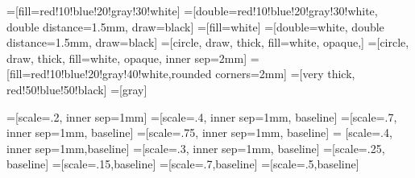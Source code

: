 =[fill=red!10!blue!20!gray!30!white]
=[double=red!10!blue!20!gray!30!white, double distance=1.5mm, draw=black]
=[fill=white]
=[double=white, double distance=1.5mm, draw=black]
=[circle, draw, thick, fill=white, opaque,]
=[circle, draw, thick, fill=white, opaque, inner sep=2mm]
= [fill=red!10!blue!20!gray!40!white,rounded corners=2mm] 
=[very thick, red!50!blue!50!black]
=[gray]

=[scale=.2, inner sep=1mm]
=[scale=.4, inner sep=1mm, baseline]
=[scale=.7, inner sep=1mm, baseline]
=[scale=.75, inner sep=1mm, baseline]
= [scale=.4, inner sep=1mm,baseline] 
=[scale=.3, inner sep=1mm, baseline]
=[scale=.25, baseline]
=[scale=.15,baseline]
=[scale=.7,baseline]
=[scale=.5,baseline]